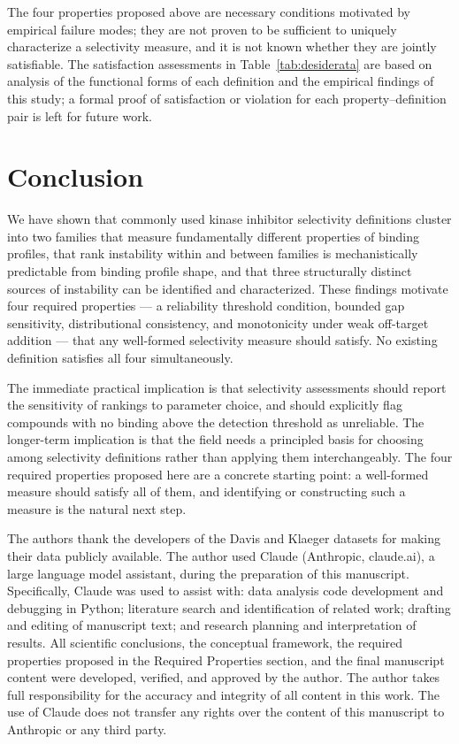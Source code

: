 \documentclass[journal=jcisd8,manuscript=article]{achemso}
\begin{document}
The four properties proposed above are necessary
conditions motivated by empirical failure modes; they are not proven to be
sufficient to uniquely characterize a selectivity measure, and it is not known
whether they are jointly satisfiable.
The satisfaction assessments in Table~\ref{tab:desiderata} are based on
analysis of the functional forms of each definition and the empirical findings
of this study; a formal proof of satisfaction or violation for each
property--definition pair is left for future work.

\section{Conclusion}
\label{sec:conclusion}

We have shown that commonly used kinase inhibitor selectivity definitions
cluster into two families that measure fundamentally different properties of
binding profiles, that rank instability within and between families is
mechanistically predictable from binding profile shape, and that three
structurally distinct sources of instability can be identified and
characterized.
These findings motivate four required properties --- a reliability threshold
condition, bounded gap sensitivity, distributional consistency, and monotonicity
under weak off-target addition --- that any well-formed selectivity measure
should satisfy.
No existing definition satisfies all four simultaneously.

The immediate practical implication is that selectivity assessments should
report the sensitivity of rankings to parameter choice, and should explicitly
flag compounds with no binding above the detection threshold as unreliable.
The longer-term implication is that the field needs a principled basis for
choosing among selectivity definitions rather than applying them
interchangeably.
The four required properties proposed here are a concrete starting point: a
well-formed measure should satisfy all of them, and identifying or constructing
such a measure is the natural next step.


\begin{acknowledgement}
The authors thank the developers of the Davis and Klaeger datasets for making
their data publicly available.
The author used Claude (Anthropic, claude.ai), a large language model assistant,
during the preparation of this manuscript.
Specifically, Claude was used to assist with: data analysis code development and
debugging in Python; literature search and identification of related work;
drafting and editing of manuscript text; and research planning and
interpretation of results.
All scientific conclusions, the conceptual framework, the required properties proposed in the
Required Properties section, and the final manuscript content were developed, verified, and
approved by the author.
The author takes full responsibility for the accuracy and integrity of all
content in this work.
The use of Claude does not transfer any rights over the content of this manuscript
to Anthropic or any third party.
\end{acknowledgement}
\end{document}
